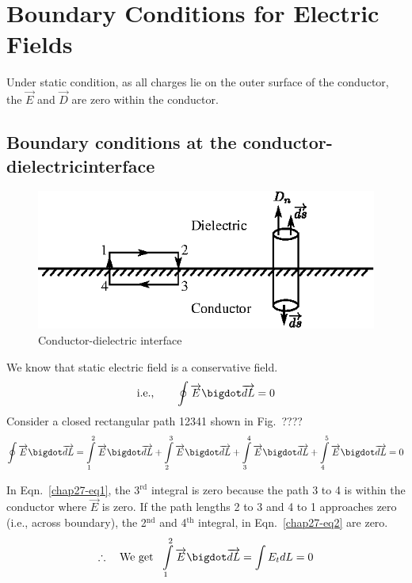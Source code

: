 \setcounter{chapter}{26}
\chapter{Boundary Conditions for Electric Fields}\label{chap27}

Under static condition, as all charges lie on the outer surface of the conductor, the $\overrightarrow{E}$ and $\overrightarrow{D}$ are zero within the conductor.

\section{Boundary conditions at the conductor-dielectric\break interface}
\begin{figure}[H]
\centering
\includegraphics[scale=1.1]{images/fig1.eps}
\caption{Conductor-dielectric interface}\label{chap27-fig1}
\end{figure}

We know that static electric field is a conservative field. 
$$
\text{i.e.,}\qquad \oint \overrightarrow{E} \bigdot \overrightarrow{dL} = 0
$$
Consider a closed rectangular path 12341 shown in Fig.~????
\begin{equation*}
\oint \overrightarrow{E} \bigdot \overrightarrow{dL} = \int\limits_{1}^{2} \overrightarrow{E} \bigdot \overrightarrow{dL} + \int\limits_{2}^{3} \overrightarrow{E} \bigdot \overrightarrow{dL} + \int\limits_{3}^{4} \overrightarrow{E} \bigdot \overrightarrow{dL} + \int\limits_{4}^{5} \overrightarrow{E} \bigdot \overrightarrow{dL} = 0\label{chap27-eq1}
\end{equation*}

In Eqn.~\eqref{chap27-eq1}, the 3$^{\text{rd}}$ integral is zero because the path 3 to 4 is within the conductor where $\overrightarrow{E}$ is zero. If the path lengths 2 to 3 and 4 to 1 approaches zero (i.e., across boundary), the 2$^{\text{nd}}$ and 4$^{\text{th}}$ integral, in Eqn.~\eqref{chap27-eq2} are zero.
\begin{equation*}
\therefore\quad \text{We get } \ \int\limits_{1}^{2} \overrightarrow{E} \bigdot \overrightarrow{dL} = \int E_{t}dL = 0\label{chap27-eq2}
\end{equation*}

